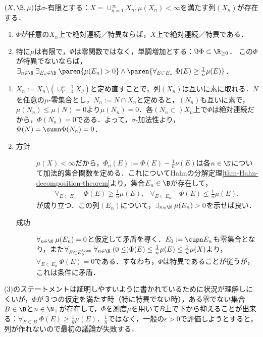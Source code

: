 \documentclass[uplatex, dvipdfmx]{jsreport}
\begin{document}
\begin{lemma}\label{lemma-sigma-finite}
    $(X,\B,\mu)$は$\sigma$-有限とする：$X=\cup^\infty_{n=1}X_n,\mu(X_n)<\infty$を満たす列$(X_n)$が存在する．
    \begin{enumerate}
        \item $\Phi$が任意の$X_n$上で絶対連続／特異ならば，$X$上で絶対連続／特異である．
        \item 特に$\mu$は有限で，$\Phi$は零関数ではなく，単調増加とする：$\Im\Phi\subset\R_{\ge 0}$．
        この$\Phi$が特異でないならば，$\exists_{n\in\N}\;\exists_{E_n\in\B}\;\paren{\mu(E_n)>0}\land\paren{\forall_{E\subset E_n}\;\Phi(E)\ge\frac{1}{n}\mu(E)}$．
    \end{enumerate}
\end{lemma}
\begin{Proof}\mbox{}
    \begin{enumerate}
        \item $X_n:=X_n\setminus(\cup_{\nu=1}^{n-1}X_\nu)$と定め直すことで，列$(X_n)$は互いに素に取れる．$N$を任意の$\mu$-零集合とし，$N_n:=N\cap X_n$と定めると，$(N_n)$も互いに素で，$\mu(N_n)\le\mu(N)=0$より$\mu(N_n)=0$．各$(N_n\subset )X_n$上で$\Phi$は絶対連続だから，$\Phi(N_n)=0$である．よって，$\sigma$-加法性より，$\Phi(N)=\sumn\Phi(N_n)=0$．
        \item \begin{description}
            \item[方針] 
        $\mu(X)<\infty$だから，$\Phi_n(E):=\Phi(E)-\frac{1}{n}\nu(E)$は各$n\in\N$について加法的集合関数を定める．これについてHahnの分解定理\ref{thm-Hahn-decomposition-theorem}より，集合$E_n\in\B$が存在して，
        \begin{align*}
            \forall_{E\subset E_n}\;&\Phi(E)\ge\frac{1}{n}\mu(E),&\forall_{E\subset E_n^\comp}\;&\Phi(E)\le\frac{1}{n}\mu(E),
        \end{align*}
        が成り立つ．この列$(E_n)$について，$\exists_{n\in\N}\;\mu(E_n)>0$を示せば良い．
            \item[成功]
        $\forall_{n\in\N}\;\mu(E_n)=0$と仮定して矛盾を導く．$E_0:=\cupn E_n$も零集合となり，また$\forall_{E\subset E_0^\comp}\;\forall_{n\in\N}\;(0\le)\Phi(E)\le\frac{1}{n}\mu(E)\le\frac{1}{n}\mu(X)$より，$\forall_{E\subset E_0^\comp}\;\Phi(E)=0$である．すなわち，$\Phi$は特異であることが従うが，これは条件に矛盾．
        \end{description}
    \end{enumerate}
\end{Proof}
\begin{remarks}
    (3)のステートメントは証明しやすいように書かれているために状況が理解しにくいが，$\Phi$が３つの仮定を満たす時（特に特異でない時），ある零でない集合$B\in\B$と$n\in\N_+$が存在して，$\Phi$を測度$\mu$を用いて$B$上で下から抑えることが出来る：$\forall_{E\subset B}\;\Phi(E)\ge\frac{1}{n}\mu(E)$．$\frac{1}{n}$ではなく，一般の$\epsilon>0$で評価しようとすると，列が作れないので最初の議論が失敗する．
\end{remarks}
\end{document}
